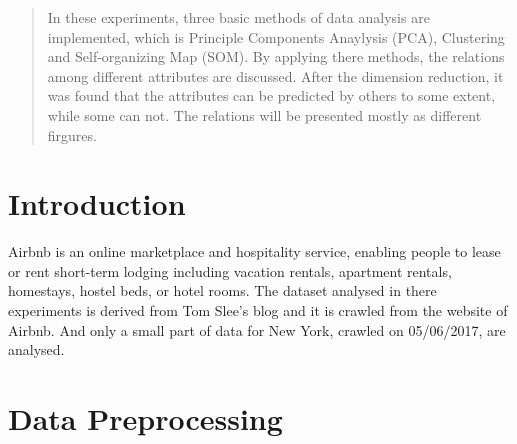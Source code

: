 \documentclass[12pt]{article}
\begin{document}
\begin{abstract}
   In these experiments, three basic methods of data analysis are implemented, which is Principle Components Anaylysis (PCA), Clustering and Self-organizing Map (SOM). By applying there methods, the relations among different attributes are discussed. After the dimension reduction, it was found that the attributes can be predicted by others to some extent, while some can not. The relations will be presented mostly as different firgures.
\end{abstract}
\tableofcontents
\pagebreak
\section{Introduction}
Airbnb is an online marketplace and hospitality service, enabling people to lease or rent short-term lodging including vacation rentals, apartment rentals, homestays, hostel beds, or hotel rooms. The dataset analysed in there experiments is derived from Tom Slee's blog\cite{slee-2017} and it is crawled from the website of Airbnb. And only a small part of data for New York, crawled on 05/06/2017, are analysed.

\section{Data Preprocessing}
\end{document}
